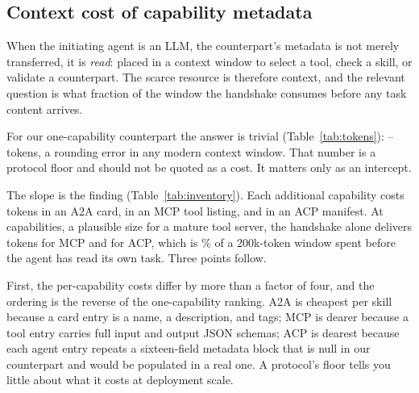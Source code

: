 \documentclass[10pt]{article}
\begin{document}
\subsection{Context cost of capability metadata}
\label{sec:results-tokens}

\begin{table}[t]
\centering
\small
\caption{Capability metadata an LLM-driven initiator ingests during one
cold handshake with our one-capability counterpart (exact wire bodies;
\texttt{o200k\_base} tokens, a lower bound; see
Section~\ref{sec:method}).}
\label{tab:tokens}

\end{table}

\begin{table}[t]
\centering
\small
\caption{Handshake metadata in tokens as the counterpart's capability
inventory grows, and the marginal cost of one capability. Built by
replicating the captured wire entry $n$ times inside the byte-identical
envelope, so the documents are exactly what a counterpart with $n$ such
capabilities would serve.}
\label{tab:inventory}

\end{table}

When the initiating agent is an LLM, the counterpart's metadata is not
merely transferred, it is \emph{read}: placed in a context window to
select a tool, check a skill, or validate a counterpart. The scarce
resource is therefore context, and the relevant question is what fraction
of the window the handshake consumes before any task content arrives.

For our one-capability counterpart the answer is trivial
(Table~\ref{tab:tokens}): \TokAcp{}--\TokMcpModern{} tokens, a rounding
error in any modern context window. That number is a protocol floor and
should not be quoted as a cost. It matters only as an intercept.

The slope is the finding (Table~\ref{tab:inventory}). Each additional
capability costs \InvPerCapAtoa{} tokens in an A2A card,
\InvPerCapMcp{} in an MCP tool listing, and \InvPerCapAcp{} in an ACP
manifest. At \InvMaxN{} capabilities, a plausible size for a mature tool
server, the handshake alone delivers \InvMcpNTwoHundred{} tokens for MCP and
\InvAcpNTwoHundred{} for ACP, which is \InvMaxCtxPct{}\% of a 200k-token window
spent before the agent has read its own task. Three points follow.

First, the per-capability costs differ by more than a factor of four, and
the ordering is the reverse of the one-capability ranking. A2A is
cheapest per skill because a card entry is a name, a description, and
tags; MCP is dearer because a tool entry carries full input and output
JSON schemas; ACP is dearest because each agent entry repeats a
sixteen-field metadata block that is null in our counterpart and would be
populated in a real one. A protocol's floor tells you little about what it
costs at deployment scale.
\end{document}
